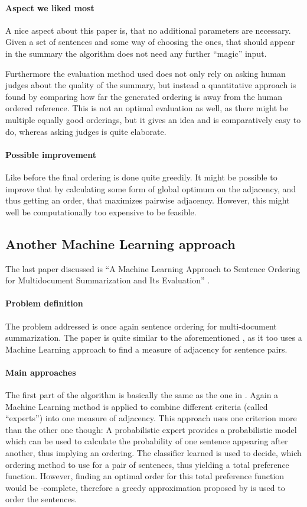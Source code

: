 \documentclass[11pt]{article}
\begin{document}
\paragraph{Aspect we liked most} A nice aspect about this paper is, that no additional parameters
are necessary. Given a set of sentences and some way of choosing the ones, that should appear in the
summary the algorithm does not need any further ``magic'' input. 

Furthermore the evaluation method used does not only rely on asking human judges about the quality
of the summary, but instead a quantitative approach is found by comparing how far the generated
ordering is away from the human ordered reference. This is not an optimal evaluation as well, as
there might be multiple equally good orderings, but it gives an idea and is comparatively easy to
do, whereas asking judges is quite elaborate.
\paragraph{Possible improvement} Like before the final ordering is done quite greedily. It might be
possible to improve that by calculating some form of global optimum on the adjacency, and thus
getting an order, that maximizes pairwise adjacency. However, this might well be computationally too
expensive to be feasible.
\subsection{Another Machine Learning approach}
The last paper discussed is ``A Machine Learning Approach to Sentence Ordering for Multidocument
Summarization and Its Evaluation'' \cite{BollegalaOI05}.
\paragraph{Problem definition} The problem addressed is once again sentence ordering for
multi-document summarization. The paper is quite similar to the aforementioned
\cite{Bollegala201089}, as it too uses a Machine Learning approach to find a measure of adjacency
for sentence pairs.
\paragraph{Main approaches} The first part of the algorithm is basically the same as the one in
\cite{Bollegala201089}. Again a Machine Learning method is applied to combine different criteria
(called ``experts'') into one measure of adjacency. This approach uses one criterion more than the
other one though: A probabilistic expert provides a probabilistic model which can be used to
calculate the probability of one sentence appearing after another, thus implying an ordering. The
classifier learned is used to decide, which ordering method to use for a pair of sentences, thus
yielding a total preference function. However, finding an optimal order for this total preference
function would be \NP-complete, therefore a greedy approximation proposed by \cite{CohenSS99} is
used to order the sentences.
\end{document}
